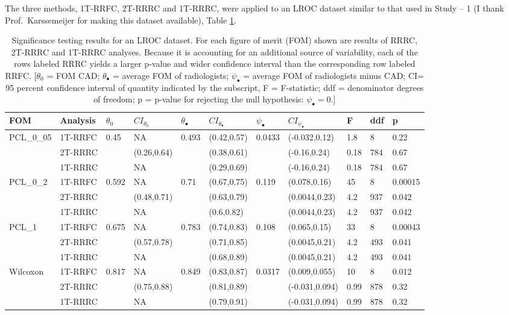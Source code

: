 \documentclass[
]{book}
\begin{document}
The three methods, 1T-RRFC, 2T-RRRC and 1T-RRRC, were applied to an LROC dataset similar to that used in Study -- 1 (I thank Prof.~Karssemeijer for making this dataset available), Table \ref{tab:standalone-cad-table2}.

\begin{table}

\caption{\label{tab:standalone-cad-table2}Significance testing results for an LROC dataset. For each figure of merit (FOM) shown are results of RRRC, 2T-RRRC and 1T-RRRC analyses. Because it is accounting for an additional source of variability, each of the rows labeled RRRC yields a larger p-value and wider confidence interval than the corresponding row labeled RRFC. [$\theta_0$ = FOM CAD; $\theta_{\bullet}$ = average FOM of radiologists; $\psi_{\bullet}$ = average FOM of radiologists minus CAD; CI= 95 percent confidence interval of quantity indicated by the subscript, F = F-statistic; ddf = denominator degrees of freedom; p = p-value for rejecting the null hypothesis: $\psi_{\bullet} = 0$.]}
\centering
\fontsize{10}{12}\selectfont
\begin{tabular}[t]{lllllllllll}
\toprule
FOM & Analysis & $\theta_0$ & $CI_{\theta_0}$ & $\theta_{\bullet}$ & $CI_{\theta_{\bullet}}$ & $\psi_{\bullet}$ & $CI_{\psi_{\bullet}}$ & F & ddf & p\\
\midrule
PCL\_0\_05 & 1T-RRFC & 0.45 & NA & 0.493 & (0.42,0.57) & 0.0433 & (-0.032,0.12) & 1.8 & 8 & 0.22\\
 & 2T-RRRC &  & (0.26,0.64) &  & (0.38,0.61) &  & (-0.16,0.24) & 0.18 & 784 & 0.67\\
 & 1T-RRRC &  & NA &  & (0.29,0.69) &  & (-0.16,0.24) & 0.18 & 784 & 0.67\\
PCL\_0\_2 & 1T-RRFC & 0.592 & NA & 0.71 & (0.67,0.75) & 0.119 & (0.078,0.16) & 45 & 8 & 0.00015\\
 & 2T-RRRC &  & (0.48,0.71) &  & (0.63,0.79) &  & (0.0044,0.23) & 4.2 & 937 & 0.042\\
\addlinespace
 & 1T-RRRC &  & NA &  & (0.6,0.82) &  & (0.0044,0.23) & 4.2 & 937 & 0.042\\
PCL\_1 & 1T-RRFC & 0.675 & NA & 0.783 & (0.74,0.83) & 0.108 & (0.065,0.15) & 33 & 8 & 0.00043\\
 & 2T-RRRC &  & (0.57,0.78) &  & (0.71,0.85) &  & (0.0045,0.21) & 4.2 & 493 & 0.041\\
 & 1T-RRRC &  & NA &  & (0.68,0.89) &  & (0.0045,0.21) & 4.2 & 493 & 0.041\\
Wilcoxon & 1T-RRFC & 0.817 & NA & 0.849 & (0.83,0.87) & 0.0317 & (0.009,0.055) & 10 & 8 & 0.012\\
\addlinespace
 & 2T-RRRC &  & (0.75,0.88) &  & (0.81,0.89) &  & (-0.031,0.094) & 0.99 & 878 & 0.32\\
 & 1T-RRRC &  & NA &  & (0.79,0.91) &  & (-0.031,0.094) & 0.99 & 878 & 0.32\\
\bottomrule
\end{tabular}
\end{table}
\end{document}
